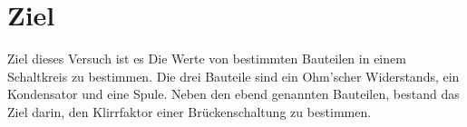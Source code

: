\section{Ziel}
\label{sec:Ziel}
Ziel dieses Versuch ist es Die Werte von bestimmten Bauteilen in einem Schaltkreis zu bestimmen. Die drei Bauteile sind ein Ohm'scher Widerstands, ein Kondensator
und eine Spule. Neben den ebend genannten Bauteilen, bestand das Ziel darin, den Klirrfaktor einer Brückenschaltung zu bestimmen.
